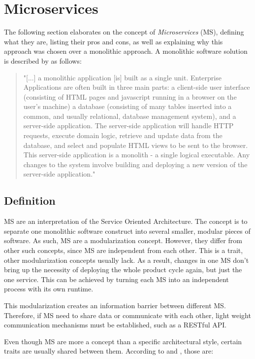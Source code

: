 \section{Microservices}
The following section elaborates on the concept of \emph{Microservices} (MS), defining what they are, listing their pros and cons, as well as explaining why this approach was chosen over a monolithic approach. A monolithic software solution is described by \cite{Lewis14} as follows:
\begin{quotation}
	"[...] a monolithic application [is] built as a single unit. Enterprise Applications are often built in three main parts: a client-side user interface (consisting of HTML pages and javascript running in a browser on the user's machine) a database (consisting of many tables inserted into a common, and usually relational, database management system), and a server-side application. The server-side application will handle HTTP requests, execute domain logic, retrieve and update data from the database, and select and populate HTML views to be sent to the browser. This server-side application is a monolith - a single logical executable. Any changes to the system involve building and deploying a new version of the server-side application."
\end{quotation}


\subsection{Definition}
MS are an interpretation of the Service Oriented Architecture. The concept is to separate one monolithic software construct into several smaller, modular pieces of software\cite{Wolff16}. As such, MS are a modularization concept. However, they differ from other such concepts, since MS are independent from each other. This is a trait, other modularization concepts usually lack\cite{Wolff16}. As a result, changes in one MS don't bring up the necessity of deploying the whole product cycle again, but just the one service. This can be achieved by turning each MS into an independent process with its own runtime\cite{Lewis14}.

This modularization creates an information barrier between different MS. Therefore, if MS need to share data or communicate with each other, light weight communication mechanisms must be established, such as a RESTful API\cite{Riggins15}.

Even though MS are more a concept than a specific architectural style, certain traits are usually shared between them\cite{Riggins15}. According to \cite{Riggins15} and \cite{Lewis14}, those are:

